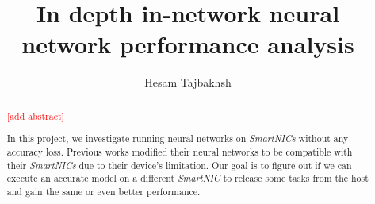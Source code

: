 \documentclass[sigconf]{acmart}
\newcommand{\smartnic}{\textit{SmartNIC} }
\newcommand{\smartnics}{\textit{SmartNICs} }
\begin{document}
\title{In depth in-network neural network performance analysis}

   
\author{Hesam Tajbakhsh}


\begin{abstract}
\textcolor{red}{[add abstract]}

In this project, we investigate running neural networks on \smartnics without any accuracy loss. Previous works modified their neural networks to be compatible with their \smartnics due to their device's limitation. Our goal is to figure out if we can execute an accurate model on a different \smartnic to release some tasks from the host and gain the same or even better performance.
\end{abstract}

\maketitle

















\end{document}
